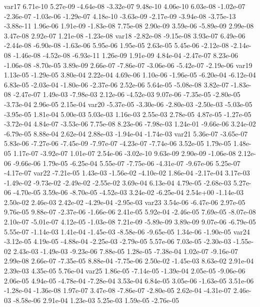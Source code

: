 var17  6.71e-10  5.27e-09 -4.64e-08 -3.32e-07  9.48e-10  4.06e-10  6.03e-08 -1.02e-07 -2.36e-07 -1.03e-06 -1.29e-07  4.18e-10 -3.63e-09 -2.17e-09 -3.94e-08 -3.75e-13 -3.88e-11  1.96e-06  1.91e-09 -1.83e-08  7.75e-08  2.90e-09  3.59e-06 -5.89e-09  2.99e-08  3.47e-08  2.92e-07  1.21e-08 -1.23e-08
var18 -2.82e-08 -9.15e-08  3.93e-07  6.49e-06 -2.44e-08 -6.90e-08 -1.63e-06  5.95e-06  1.95e-05  2.63e-05  5.45e-06 -2.12e-08 -2.14e-08 -1.46e-08 -4.52e-08 -6.93e-11  1.26e-09  1.91e-09  4.84e-04 -2.47e-07  8.23e-06 -1.06e-08 -8.70e-05  3.89e-09  2.66e-07 -7.86e-07 -3.06e-06 -5.42e-07 -2.19e-06
var19  1.13e-05 -1.29e-05  3.80e-04  2.22e-04  4.69e-06  1.10e-06 -1.96e-05 -6.20e-04 -6.12e-04  6.83e-05 -2.03e-04 -1.80e-06 -2.37e-06  2.52e-06  5.64e-05 -5.08e-08  3.82e-07 -1.83e-08 -2.47e-07  1.49e-03 -7.98e-03  2.12e-06 -4.52e-03  9.07e-06 -7.35e-05 -2.80e-05 -3.73e-04  2.96e-05  2.15e-04
var20 -5.37e-05 -3.30e-06 -2.80e-03 -2.50e-03 -5.03e-05 -3.95e-05  1.81e-04  5.00e-03  5.03e-03  1.16e-03  2.55e-03  2.78e-05  4.87e-05 -1.27e-05 -3.72e-04  4.84e-07 -3.53e-06  7.75e-08  8.23e-06 -7.98e-03  1.24e-01 -9.66e-06  3.24e-02 -6.79e-05  8.88e-04  2.62e-04  2.88e-03 -1.94e-04 -1.74e-03
var21  5.36e-07 -3.65e-07  5.83e-06 -7.27e-06 -7.45e-09 -7.97e-07 -4.23e-07 -7.74e-06  3.52e-05  1.79e-05  1.48e-05  1.17e-07 -3.92e-07  1.01e-07  2.54e-06 -3.02e-10  9.63e-09  2.90e-09 -1.06e-08  2.12e-06 -9.66e-06  1.79e-05 -6.25e-04  5.55e-07 -7.75e-06 -4.31e-07 -9.67e-06  5.25e-07 -4.17e-07
var22 -7.21e-05  1.43e-03 -1.56e-02 -4.10e-02  1.86e-04 -2.17e-04  3.17e-03 -1.49e-02 -9.73e-02 -2.49e-02 -2.55e-02  3.69e-04  6.13e-04  4.79e-05 -2.68e-03  5.27e-06 -4.70e-05  3.59e-06 -8.70e-05 -4.52e-03  3.24e-02 -6.25e-04  2.54e+00 -1.14e-03  2.50e-02  2.46e-03  2.42e-02 -4.29e-04 -2.95e-03
var23  3.54e-06 -6.47e-06  2.97e-05  9.76e-05  9.88e-07 -2.37e-06 -1.66e-06  2.41e-05  5.92e-04 -2.46e-05  7.69e-05 -8.07e-08  2.10e-07 -5.01e-07  4.12e-05 -1.03e-08  7.21e-09 -5.89e-09  3.89e-09  9.07e-06 -6.79e-05  5.55e-07 -1.14e-03  1.41e-04 -1.45e-03 -8.58e-06 -9.65e-05  1.34e-06 -1.90e-05
var24 -3.12e-05  4.19e-05 -4.88e-04 -2.25e-03 -2.79e-05  5.57e-06  7.03e-05 -2.30e-03 -1.55e-02  2.43e-03 -1.49e-03 -9.23e-06  7.88e-05  1.28e-05 -7.38e-04  1.02e-07 -9.16e-07  2.99e-08  2.66e-07 -7.35e-05  8.88e-04 -7.75e-06  2.50e-02 -1.45e-03  8.63e-02  2.91e-04  2.39e-03  4.35e-05  5.76e-04
var25  1.86e-05 -7.14e-05 -1.39e-04  2.05e-05 -9.06e-06  2.06e-05  4.94e-05 -4.78e-04 -7.28e-04  3.53e-04  6.84e-05  3.05e-06 -1.63e-05  3.51e-06 -1.28e-04 -1.36e-08  1.97e-07  3.47e-08 -7.86e-07 -2.80e-05  2.62e-04 -4.31e-07  2.46e-03 -8.58e-06  2.91e-04  1.23e-03  5.25e-03  1.59e-05 -2.76e-05
